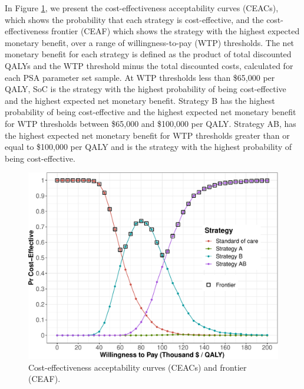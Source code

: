 \documentclass[
]{article}
\begin{document}
In Figure \ref{fig:CEAC-AgeDep}, we present the cost-effectiveness acceptability curves (CEACs), which shows the probability that each strategy is cost-effective, and the cost-effectiveness frontier (CEAF) which shows the strategy with the highest expected monetary benefit, over a range of willingness-to-pay (WTP) thresholds. The net monetary benefit for each strategy is defined as the product of total discounted QALYs and the WTP threshold minus the total discounted costs, calculated for each PSA parameter set sample. At WTP thresholds less than \$65,000 per QALY, SoC is the strategy with the highest probability of being cost-effective and the highest expected net monetary benefit. Strategy B has the highest probability of being cost-effective and the highest expected net monetary benefit for WTP thresholds between \$65,000 and \$100,000 per QALY. Strategy AB, has the highest expected net monetary benefit for WTP thresholds greater than or equal to \$100,000 per QALY and is the strategy with the highest probability of being cost-effective.

\begin{figure}[H]

{\centering \includegraphics{../figs/CEAC-AgeDep-1} 

}

\caption{Cost-effectiveness acceptability curves (CEACs) and frontier (CEAF).}\label{fig:CEAC-AgeDep}
\end{figure}
\end{document}

